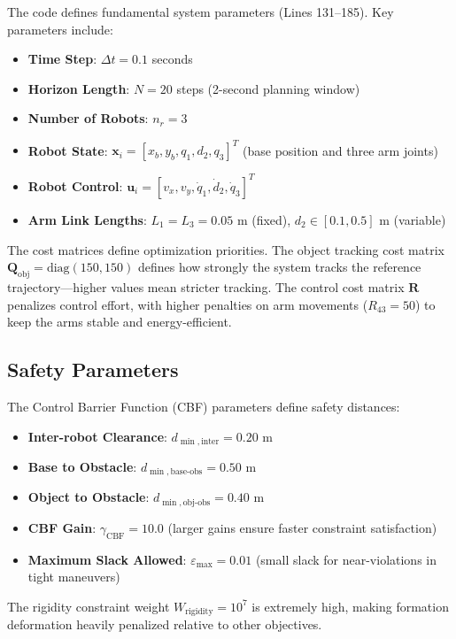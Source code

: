 \documentclass[12pt,a4paper]{article}
\begin{document}
The code defines fundamental system parameters (Lines 131--185). Key parameters include:

\begin{itemize}
    \item \textbf{Time Step}: $\Delta t = 0.1$ seconds
    \item \textbf{Horizon Length}: $N = 20$ steps (2-second planning window)
    \item \textbf{Number of Robots}: $n_r = 3$
    \item \textbf{Robot State}: $\mathbf{x}_i = [x_b, y_b, q_1, d_2, q_3]^T$ (base position and three arm joints)
    \item \textbf{Robot Control}: $\mathbf{u}_i = [v_x, v_y, \dot{q}_1, \dot{d}_2, \dot{q}_3]^T$
    \item \textbf{Arm Link Lengths}: $L_1 = L_3 = 0.05$ m (fixed), $d_2 \in [0.1, 0.5]$ m (variable)
\end{itemize}

The cost matrices define optimization priorities. The object tracking cost matrix $\mathbf{Q}_{\text{obj}} = \text{diag}(150, 150)$ defines how strongly the system tracks the reference trajectory---higher values mean stricter tracking. The control cost matrix $\mathbf{R}$ penalizes control effort, with higher penalties on arm movements ($R_{43} = 50$) to keep the arms stable and energy-efficient.

\subsection{Safety Parameters}

The Control Barrier Function (CBF) parameters define safety distances:
\begin{itemize}
    \item \textbf{Inter-robot Clearance}: $d_{\min,\text{inter}} = 0.20$ m
    \item \textbf{Base to Obstacle}: $d_{\min,\text{base-obs}} = 0.50$ m
    \item \textbf{Object to Obstacle}: $d_{\min,\text{obj-obs}} = 0.40$ m
    \item \textbf{CBF Gain}: $\gamma_{\text{CBF}} = 10.0$ (larger gains ensure faster constraint satisfaction)
    \item \textbf{Maximum Slack Allowed}: $\varepsilon_{\max} = 0.01$ (small slack for near-violations in tight maneuvers)
\end{itemize}

The rigidity constraint weight $W_{\text{rigidity}} = 10^7$ is extremely high, making formation deformation heavily penalized relative to other objectives.
\end{document}
